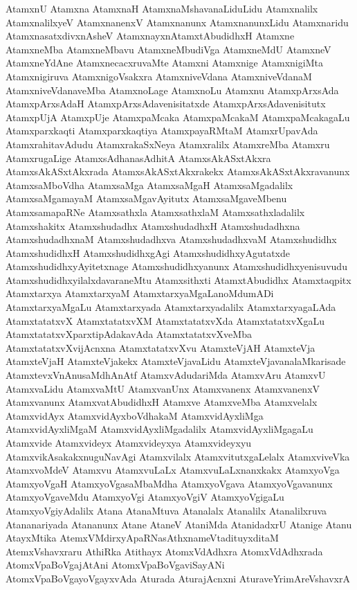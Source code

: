 {AtamxnU
Atamxna
AtamxnaH
AtamxnaMshavanaLiduLidu
Atamxnalilx
AtamxnalilxyeV
AtamxnanenxV
Atamxnanunx
AtamxnanunxLidu
Atamxnaridu
AtamxnasatxdivxnAsheV
AtamxnayxnAtamxtAbudidhxH
Atamxne
AtamxneMba
AtamxneMbavu
AtamxneMbudiVga
AtamxneMdU
AtamxneV
AtamxneYdAne
AtamxnecacxruvaMte
Atamxni
Atamxnige
AtamxnigiMta
Atamxnigiruva
AtamxnigoVsakxra
AtamxniveVdana
AtamxniveVdanaM
AtamxniveVdanaveMba
AtamxnoLage
AtamxnoLu
Atamxnu
AtamxpArxsAda
AtamxpArxsAdaH
AtamxpArxsAdavenisitatxde
AtamxpArxsAdavenisitutx
AtamxpUjA
AtamxpUje
AtamxpaMcaka
AtamxpaMcakaM
AtamxpaMcakagaLu
Atamxparxkaqti
Atamxparxkaqtiya
AtamxpayaRMtaM
AtamxrUpavAda
AtamxrahitavAdudu
AtamxrakaSxNeya
Atamxralilx
AtamxreMba
Atamxru
AtamxrugaLige
AtamxsAdhanasAdhitA
AtamxsAkASxtAkxra
AtamxsAkASxtAkxrada
AtamxsAkASxtAkxrakekx
AtamxsAkASxtAkxravanunx
AtamxsaMboVdha
AtamxsaMga
AtamxsaMgaH
AtamxsaMgadalilx
AtamxsaMgamayaM
AtamxsaMgavAyitutx
AtamxsaMgaveMbenu
AtamxsamapaRNe
Atamxsathxla
AtamxsathxlaM
Atamxsathxladalilx
Atamxshakitx
Atamxshudadhx
AtamxshudadhxH
Atamxshudadhxna
AtamxshudadhxnaM
Atamxshudadhxva
AtamxshudadhxvaM
Atamxshudidhx
AtamxshudidhxH
AtamxshudidhxgAgi
AtamxshudidhxyAgutatxde
AtamxshudidhxyAyitetxnage
Atamxshudidhxyanunx
Atamxshudidhxyenisuvudu
AtamxshudidhxyilalxdavaraneMtu
Atamxsithxti
AtamxtAbudidhx
Atamxtaqpitx
Atamxtarxya
AtamxtarxyaM
AtamxtarxyaMgaLanoMdumADi
AtamxtarxyaMgaLu
Atamxtarxyada
Atamxtarxyadalilx
AtamxtarxyagaLAda
AtamxtatatxvX
AtamxtatatxvXM
AtamxtatatxvXda
AtamxtatatxvXgaLu
AtamxtatatxvXparxtipAdakavAda
AtamxtatatxvXveMba
AtamxtatatxvXvijAcnxna
AtamxtatatxvXvu
AtamxteVjAH
AtamxteVja
AtamxteVjaH
AtamxteVjakekx
AtamxteVjavaLidu
AtamxteVjavanalaMkarisade
AtamxtevxVnAnusaMdhAnAtf
AtamxvAdudariMda
AtamxvAru
AtamxvU
AtamxvaLidu
AtamxvaMtU
AtamxvanUnx
Atamxvanenx
AtamxvanenxV
Atamxvanunx
AtamxvatAbudidhxH
Atamxve
AtamxveMba
Atamxvelalx
AtamxvidAyx
AtamxvidAyxboVdhakaM
AtamxvidAyxliMga
AtamxvidAyxliMgaM
AtamxvidAyxliMgadalilx
AtamxvidAyxliMgagaLu
Atamxvide
Atamxvideyx
Atamxvideyxya
Atamxvideyxyu
AtamxvikAsakakxnuguNavAgi
Atamxvilalx
AtamxvitutxgaLelalx
AtamxviveVka
AtamxvoMdeV
Atamxvu
AtamxvuLaLx
AtamxvuLaLxnanxkakx
AtamxyoVga
AtamxyoVgaH
AtamxyoVgasaMbaMdha
AtamxyoVgava
AtamxyoVgavanunx
AtamxyoVgaveMdu
AtamxyoVgi
AtamxyoVgiV
AtamxyoVgigaLu
AtamxyoVgiyAdalilx
Atana
AtanaMtuva
Atanalalx
Atanalilx
Atanalilxruva
Atananariyada
Atananunx
Atane
AtaneV
AtaniMda
AtanidadxrU
Atanige
Atanu
AtayxMtika
AtemxVMdirxyApaRNasAthxnameVtadituyxditaM
AtemxVshavxraru
AthiRka
Atithayx
AtomxVdAdhxra
AtomxVdAdhxrada
AtomxVpaBoVgajAtAni
AtomxVpaBoVgaviSayANi
AtomxVpaBoVgayoVgayxvAda
Aturada
AturajAcnxni
AturaveYrimAreVshavxrA
}
